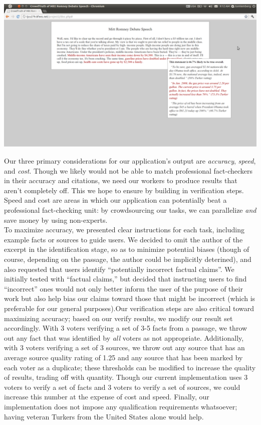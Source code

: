\documentclass[10pt]{article}
\begin{document}
\begin{center}
\includegraphics[width=6.5in]{ui2.png}
\end{center}

\noindent
Our three primary considerations for our application's output are \emph{accuracy}, \emph{speed}, and \emph{cost}. Though we likely would not be able to match professional fact-checkers in their accuracy and citations, we need our workers to produce results that aren't completely off. This we hope to ensure by building in verification steps. Speed and cost are areas in which our application can potentially beat a professional fact-checking unit: by crowdsourcing our tasks, we can parallelize \emph{and} save money by using non-experts. \\

\noindent
To maximize accuracy, we presented clear instructions for each task, including example facts or sources to guide users. We decided to omit the author of the excerpt in the identification stage, so as to minimize potential biases (though of course, depending on the passage, the author could be implicitly deterined), and also requested that users identify ``potentially incorrect factual claims''. We initially tested with ``factual claims,'' but decided that instructing users to find ``incorrect'' ones would not only better inform the user of the purpose of their work but also help bias our claims toward those that might be incorrect (which is preferable for our general purposes).Our verification steps are also critical toward maximizing accuracy; based on our verify results, we modify our result set accordingly. With 3 voters verifying a set of 3-5 facts from a passage, we throw out any fact that was identified by \emph{all} voters as not appropriate. Additionally, with 3 voters verifying a set of 3 sources, we throw out any source that has an average source quality rating of 1.25 and any source that has been marked by each voter as a duplicate; these thresholds can be modified to increase the quality of results, trading off with quantity. Though our current implementation uses 3 voters to verify a set of facts and 3 voters to verify a set of sources, we could increase this number at the expense of cost and speed. Finally, our implementation does not impose any qualification requirements whatsoever; having veteran Turkers from the United States alone would help.\\
\end{document}
